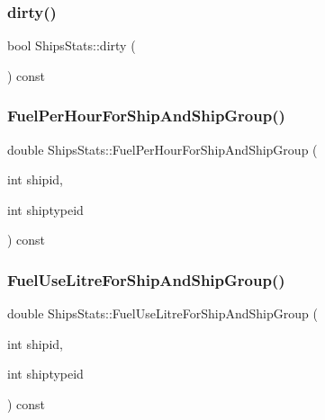 \mbox{\label{class_ships_stats_a68bf3348c0f715780144d9799b33d464}} 
\subsubsection{\texorpdfstring{dirty()}{dirty()}}
{\footnotesize\ttfamily bool Ships\+Stats\+::dirty (\begin{DoxyParamCaption}{ }\end{DoxyParamCaption}) const\hspace{0.3cm}{\ttfamily [inline]}}

\mbox{\label{class_ships_stats_aaa9a11a9b95578c70e271ddb6a2045f5}} 
\subsubsection{\texorpdfstring{FuelPerHourForShipAndShipGroup()}{FuelPerHourForShipAndShipGroup()}}
{\footnotesize\ttfamily double Ships\+Stats\+::\+Fuel\+Per\+Hour\+For\+Ship\+And\+Ship\+Group (\begin{DoxyParamCaption}\item[{int}]{shipid,  }\item[{int}]{shiptypeid }\end{DoxyParamCaption}) const}

\mbox{\label{class_ships_stats_a8c2654cf3174809d0b64e60e9f11b5cc}} 
\subsubsection{\texorpdfstring{FuelUseLitreForShipAndShipGroup()}{FuelUseLitreForShipAndShipGroup()}}
{\footnotesize\ttfamily double Ships\+Stats\+::\+Fuel\+Use\+Litre\+For\+Ship\+And\+Ship\+Group (\begin{DoxyParamCaption}\item[{int}]{shipid,  }\item[{int}]{shiptypeid }\end{DoxyParamCaption}) const}

